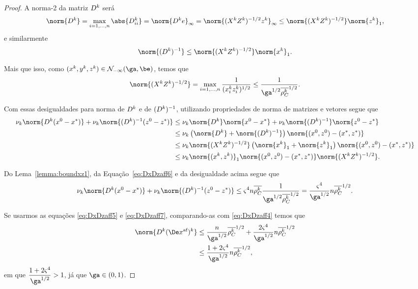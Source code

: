 \begin{proof}

A norma-2 da matriz  $D^{k}$ será
\[
 \norm{\Dk} = \max_{i=1,\ldots,n} \abs{\Dk_{ii}} = \norm{\Dk e}_{\infty} = \norm{(\Xk\Zk)^{-1/2}\zk}_{\infty} \leq \norm{(\Xk\Zk)^{-1/2}}\norm{\zk}_{1},
\]
e similarmente
\[
\norm{\Dik} \leq  \norm{(\Xk\Zk)^{-1/2}} \norm{\xk}_{1}.
\]

Mais que isso, como $(\xk,\yk,\zk)\in\Nset_{-\infty}(\ga,\be)$, temos que 
\begin{equation}
\label{eq:DxDzaff6}
	\norm{(\Xk\Zk)^{-1/2}} = \max_{i=1,\ldots,n}\frac{1}{(\xk_i\zk_i)^{1/2}} \leq \frac{1}{\ga^{1/2}\rhoCkb^{1/2}}.
\end{equation}

Com essas desigualdades para norma de $D^{k}$ e de $(D^{k})^{-1}$, utilizando propriedades de norma de matrizes e vetores segue que
\[
\begin{aligned}
 \nuk  \norm{\Dk(\xzero - \xstar)} + \nuk  \norm{\Dik(\zzero - \zstar)}  & \leq \nuk  \norm{\Dk}\norm{\xzero - \xstar} + \nuk  \norm{\Dik}\norm{\zzero - \zstar} \notag \\
 					& \leq \nuk \left(  \norm{\Dk} + \norm{\Dik}   \right)\norm{(\xzero,\zzero) - (\xstar,\zstar)} \\
 					& \leq \nuk  \norm{(\Xk\Zk)^{-1/2}} \left(  \norm{\xk}_{1}  +\norm{\zk}_{1}   \right)\norm{(\xzero,\zzero) - (\xstar,\zstar)} \\ 
 					& \leq  \nuk \norm{(\xk,\zk)}_{1}\norm{(\xzero,\zzero) - (\xstar,\zstar)}\norm{(\Xk\Zk)^{-1/2}}.
\end{aligned}
\]

Do Lema~\ref{lemma:boundxz1}, da Equação~\eqref{eq:DxDzaff6}  e da desigualdade acima segue que 
\begin{equation} \label{eq:DxDzaff7}
 \nuk  \norm{\Dk(\xzero - \xstar)} + \nuk  \norm{\Dik(\zzero - \zstar)}  \leq \bdxzstar^{4} n  \rhoCkb \frac{1}{\ga^{1/2}\rhoCkb ^{1/2}}  = \frac{\bdxzstar^{4}}{\ga^{1/2}}n \rhoCkb ^{1/2}.
\end{equation}

Se usarmos as equações \eqref{eq:DxDzaff5} e \eqref{eq:DxDzaff7}, comparando-as com \eqref{eq:DxDzaff4} temos que 
\[
\begin{aligned}
\norm{\Dk \dekx} & \leq \frac{n}{\ga^{1/2}}\rhoCkb ^{1/2} +  \frac{2\bdxzstar^{4}}{\ga^{1/2}}n \rhoCkb ^{1/2} \\
				& \leq \frac{1 + 2\bdxzstar^{4} }{\ga^{1/2}} n \rhoCkb ^{1/2},
\end{aligned}
\]
em que	$\dfrac{1 + 2\bdxzstar^{4} }{\ga^{1/2}} >1$,  já que  $\ga\in(0,1)$. 


\end{proof}

